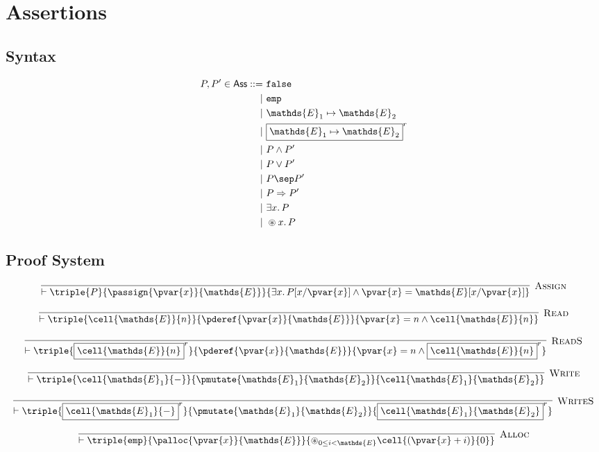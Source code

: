 \section{Assertions}

\subsection{Syntax}

\begin{align*}
P, P' \in \mathsf{Ass} ::=&
\ \mathtt{false} \\
|&\ \mathtt{emp} \\
|&\ \mathds{E}_1 \mapsto \mathds{E}_2 \\
|&\ \boxed{\mathds{E}_1 \mapsto \mathds{E}_2}^r \\
|&\ P \land P' \\
|&\ P \lor P' \\
|&\ P \sep P' \\
|&\ P \Rightarrow P' \\
|&\ \exists x \ldotp P \\
|&\ \circledast x \ldotp P
\end{align*}

\subsection{Proof System}

\[
\infer[\textsc{Assign}]
{
	\vdash \triple
	{P}
	{\passign{\pvar{x}}{\mathds{E}}}
	{\exists x\ldotp P[x/\pvar{x}] \land \pvar{x} = \mathds{E}[x/\pvar{x}]}
}
{}
\]

\[
\infer[\textsc{Read}]
{
	\vdash \triple
	{\cell{\mathds{E}}{n}}
	{\pderef{\pvar{x}}{\mathds{E}}}
	{\pvar{x} = n \land \cell{\mathds{E}}{n}}
}
{}
\]

\[
\infer[\textsc{ReadS}]
{
	\vdash \triple
	{\boxed{\cell{\mathds{E}}{n}}^r}
	{\pderef{\pvar{x}}{\mathds{E}}}
	{\pvar{x} = n \land \boxed{\cell{\mathds{E}}{n}}^r}
}
{}
\]

\[
\infer[\textsc{Write}]
{
	\vdash \triple
	{\cell{\mathds{E}_1}{-}}
	{\pmutate{\mathds{E}_1}{\mathds{E}_2}}
	{\cell{\mathds{E}_1}{\mathds{E}_2}}
}
{}
\]

\[
\infer[\textsc{WriteS}]
{
	\vdash \triple
	{\boxed{\cell{\mathds{E}_1}{-}}^r}
	{\pmutate{\mathds{E}_1}{\mathds{E}_2}}
	{\boxed{\cell{\mathds{E}_1}{\mathds{E}_2}}^r}
}
{}
\]

\[
\infer[\textsc{Alloc}]
{
	\vdash \triple
	{\mathtt{emp}}
	{\palloc{\pvar{x}}{\mathds{E}}}
	{\circledast_{0 \leq i < \mathds{E}}\cell{(\pvar{x} + i)}{0}}
}
{}
\]


